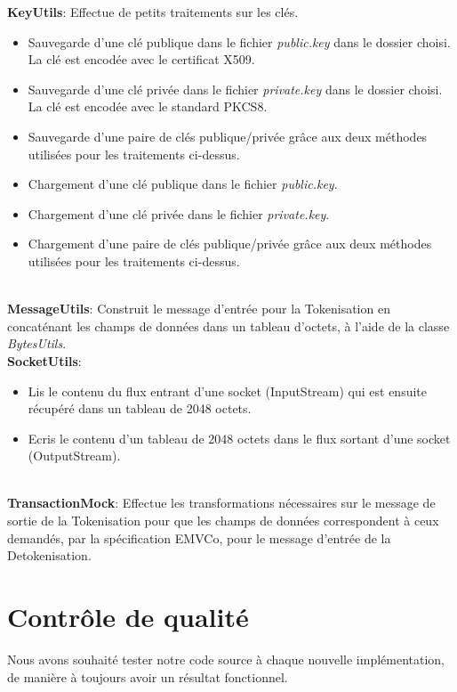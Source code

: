 \documentclass{report}
\begin{document}
\noindent
\textbf{KeyUtils}: Effectue de petits traitements sur les clés.
\begin{itemize}
	\item Sauvegarde d'une clé publique dans le fichier \textit{public.key} dans le dossier choisi. La clé est encodée avec le certificat X509.
	\item Sauvegarde d'une clé privée dans le fichier \textit{private.key} dans le dossier choisi. La clé est encodée avec le standard PKCS8.
	\item Sauvegarde d'une paire de clés publique/privée grâce aux deux méthodes utilisées pour les traitements ci-dessus.
	\item Chargement d'une clé publique dans le fichier \textit{public.key}.
	\item Chargement d'une clé privée dans le fichier \textit{private.key}.
	\item Chargement d'une paire de clés publique/privée grâce aux deux méthodes utilisées pour les traitements ci-dessus.
\end{itemize}

~\\
\noindent
\textbf{MessageUtils}: Construit le message d'entrée pour la Tokenisation en concaténant les champs de données dans un tableau d'octets, à l'aide de la classe \textit{BytesUtils}.\\

\noindent
\textbf{SocketUtils}: 
\begin{itemize}
	\item Lis le contenu du flux entrant d'une socket (InputStream) qui est ensuite récupéré dans un tableau de 2048 octets.
	\item Ecris le contenu d'un tableau de 2048 octets dans le flux sortant d'une socket (OutputStream).
\end{itemize}

~\\
\noindent
\textbf{TransactionMock}: Effectue les transformations nécessaires sur le message de sortie de la Tokenisation pour que les champs de données correspondent à ceux demandés, par la spécification EMVCo, pour le message d'entrée de la Detokenisation.


\section{Contrôle de qualité}
Nous avons souhaité tester notre code source à chaque nouvelle implémentation, de manière à toujours avoir un résultat fonctionnel.  
\end{document}
